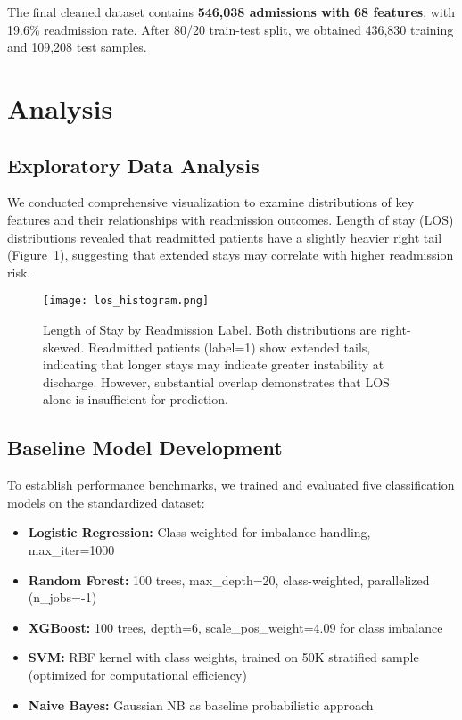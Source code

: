 \documentclass[runningheads]{llncs}
\begin{document}
The final cleaned dataset contains \textbf{546,038 admissions with 68 features}, with 19.6\% readmission rate. After 80/20 train-test split, we obtained 436,830 training and 109,208 test samples.

\section{Analysis}

\subsection{Exploratory Data Analysis}
We conducted comprehensive visualization to examine distributions of key features and their relationships with readmission outcomes. Length of stay (LOS) distributions revealed that readmitted patients have a slightly heavier right tail (Figure~\ref{fig:los}), suggesting that extended stays may correlate with higher readmission risk.

\begin{figure}[ht]
    \centering
    \texttt{[image: los\_histogram.png]}
    \caption{Length of Stay by Readmission Label. Both distributions are right-skewed. Readmitted patients (label=1) show extended tails, indicating that longer stays may indicate greater instability at discharge. However, substantial overlap demonstrates that LOS alone is insufficient for prediction.}
    \label{fig:los}
\end{figure}

\subsection{Baseline Model Development}
To establish performance benchmarks, we trained and evaluated five classification models on the standardized dataset:

\begin{itemize}
    \item \textbf{Logistic Regression:} Class-weighted for imbalance handling, max\_iter=1000
    \item \textbf{Random Forest:} 100 trees, max\_depth=20, class-weighted, parallelized (n\_jobs=-1)
    \item \textbf{XGBoost:} 100 trees, depth=6, scale\_pos\_weight=4.09 for class imbalance
    \item \textbf{SVM:} RBF kernel with class weights, trained on 50K stratified sample (optimized for computational efficiency)
    \item \textbf{Naive Bayes:} Gaussian NB as baseline probabilistic approach
\end{itemize}
\end{document}

